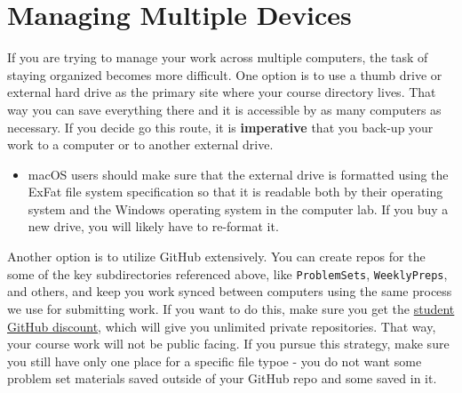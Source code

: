 \documentclass[]{book}
\newenvironment{rmdblock}[1]
  {\begin{shaded*}
  \begin{itemize}
  \renewcommand{\labelitemi}{
    \raisebox{-.7\height}[0pt][0pt]{
      {\setkeys{Gin}{width=3em,keepaspectratio}\texttt{[image: images/\#1]}}
    }
  }
  \item
  }
  {
  \end{itemize}
  \end{shaded*}
  }
\newenvironment{rmdtip}
  {\begin{rmdblock}{tip}}
  {\end{rmdblock}}
\theoremstyle{definition}
\theoremstyle{definition}
\theoremstyle{definition}
\theoremstyle{remark}
\begin{document}
\section{Managing Multiple Devices}\label{managing-multiple-devices}

If you are trying to manage your work across multiple computers, the
task of staying organized becomes more difficult. One option is to use a
thumb drive or external hard drive as the primary site where your course
directory lives. That way you can save everything there and it is
accessible by as many computers as necessary. If you decide go this
route, it is \textbf{imperative} that you back-up your work to a
computer or to another external drive.

\begin{rmdtip}
macOS users should make sure that the external drive is formatted using
the ExFat file system specification so that it is readable both by their
operating system and the Windows operating system in the computer lab.
If you buy a new drive, you will likely have to re-format it.
\end{rmdtip}

Another option is to utilize GitHub extensively. You can create repos
for the some of the key subdirectories referenced above, like
\texttt{ProblemSets}, \texttt{WeeklyPreps}, and others, and keep you
work synced between computers using the same process we use for
submitting work. If you want to do this, make sure you get the
\href{https://education.github.com/discount_requests/new}{student GitHub
discount}, which will give you unlimited private repositories. That way,
your course work will not be public facing. If you pursue this strategy,
make sure you still have only one place for a specific file typoe - you
do not want some problem set materials saved outside of your GitHub repo
and some saved in it.


\end{document}

